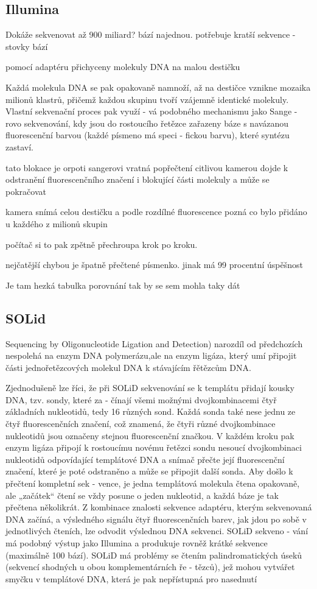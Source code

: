 \documentclass[czech,DP]{thesiskiv}
\begin{document}
\subsection{Illumina}
Dokáže sekvenovat až 900 miliard? bází najednou. 
potřebuje kratší sekvence - stovky bází

pomocí adaptéru přichyceny molekuly DNA na malou destičku

Každá molekula DNA se pak opakovaně namnoží, až na destičce vznikne
mozaika milionů klastrů, přičemž každou
skupinu tvoří vzájemně identické molekuly. Vlastní sekvenační proces pak využí -
vá podobného mechanismu jako Sange -
rovo sekvenování, kdy jsou do rostoucího
řetězce zařazeny báze s navázanou fluorescenční barvou (každé písmeno má speci -
fickou barvu), které syntézu zastaví.

tato blokace je orpoti sangerovi vratná
 popřečtení citlivou kamerou dojde k odstranění fluorescenčního značení i blokující části molekuly
 a může se pokračovat
 
 kamera snímá celou destičku
 a podle rozdílné fluorescence pozná co bylo přidáno u každého z milionů skupin
 
 počítač si to pak zpětně přechroupa krok po kroku.
 

nejčatější chybou je špatně přečtené písmenko. 
jinak má 99 procentní úspěšnost

Je tam hezká tabulka porovnání tak by se sem mohla taky dát

\subsection{SOLid}
Sequencing by Oligonucleotide Ligation and Detection)
narozdíl od předchozích nespolehá na enzym DNA polymerázu,ale na enzym ligáza, který umí připojit části jednořetězcových molekul DNA k stávajícím řětězcům DNA.

 Zjednodušeně lze říci,
že při SOLiD sekvenování se k templátu
přidají kousky DNA, tzv. sondy, které za -
čínají všemi možnými dvojkombinacemi
čtyř základních nukleotidů, tedy 16 různých sond. Každá sonda také nese jednu ze
čtyř fluorescenčních značení, což znamená, že čtyři různé dvojkombinace nukleotidů jsou označeny stejnou fluorescenční
značkou. V každém kroku pak enzym ligáza připojí k rostoucímu novému řetězci
sondu nesoucí dvojkombinaci nukleotidů odpovídající templátové DNA a snímač
přečte její fluorescenční značení, které je
poté odstraněno a může se připojit další
sonda. Aby došlo k přečtení kompletní sek -
vence, je jedna templátová molekula čtena
opakovaně, ale „začátek“ čtení se vždy
posune o jeden nukleotid, a každá báze je
tak přečtena několikrát. Z kombinace znalosti sekvence adaptéru, kterým sekvenovaná DNA začíná, a výsledného signálu
čtyř fluorescenčních barev, jak jdou po
sobě v jednotlivých čteních, lze odvodit
výslednou DNA sekvenci. SOLiD sekveno -
vání má podobný výstup jako Illumina
a produkuje rovněž krátké sekvence (maximálně 100 bází). SOLiD má problémy se
čtením palindromatických úseků (sekvencí shodných u obou komplementárních ře -
tězců), jež mohou vytvářet smyčku v templátové DNA, která je pak nepřístupná pro
nasednutí 
\end{document}
